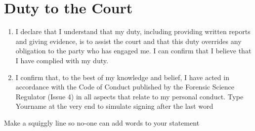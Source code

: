 \documentclass[11pt]{article}
\begin{document}
\section*{Duty to the Court}
\begin{enumerate}[resume]
    \item I declare that I understand that my duty, including providing written reports and giving evidence, is to assist the court and that this duty overrides any obligation to the party who has engaged me. I can confirm that I believe that I have complied with my duty.
    \item I confirm that, to the best of my knowledge and belief, I have acted in accordance with the Code of Conduct published by the Forensic Science Regulator (Issue 4) in all aspects that relate to my personal conduct. Type Yourname at the very end to simulate signing after the last word
\end{enumerate}

Make a squiggly line so no-one can add words to your statement
\end{document}

